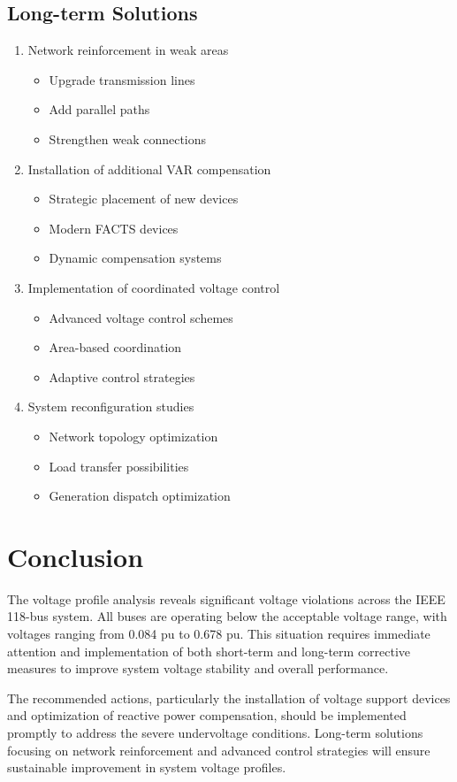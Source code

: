 \documentclass[11pt]{article}
\begin{document}
\subsection{Long-term Solutions}
\begin{enumerate}
    \item Network reinforcement in weak areas
    \begin{itemize}
        \item Upgrade transmission lines
        \item Add parallel paths
        \item Strengthen weak connections
    \end{itemize}
    
    \item Installation of additional VAR compensation
    \begin{itemize}
        \item Strategic placement of new devices
        \item Modern FACTS devices
        \item Dynamic compensation systems
    \end{itemize}
    
    \item Implementation of coordinated voltage control
    \begin{itemize}
        \item Advanced voltage control schemes
        \item Area-based coordination
        \item Adaptive control strategies
    \end{itemize}
    
    \item System reconfiguration studies
    \begin{itemize}
        \item Network topology optimization
        \item Load transfer possibilities
        \item Generation dispatch optimization
    \end{itemize}
\end{enumerate}

\section{Conclusion}
The voltage profile analysis reveals significant voltage violations across the IEEE 118-bus system. All buses are operating below the acceptable voltage range, with voltages ranging from 0.084 pu to 0.678 pu. This situation requires immediate attention and implementation of both short-term and long-term corrective measures to improve system voltage stability and overall performance.

The recommended actions, particularly the installation of voltage support devices and optimization of reactive power compensation, should be implemented promptly to address the severe undervoltage conditions. Long-term solutions focusing on network reinforcement and advanced control strategies will ensure sustainable improvement in system voltage profiles.
\end{document}

